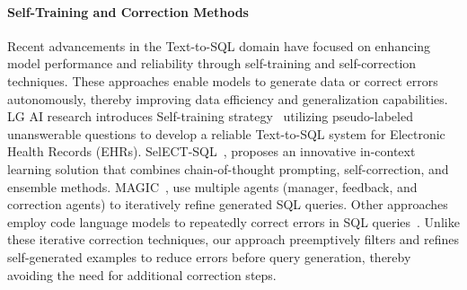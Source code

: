 \paragraph{Self-Training and Correction Methods}
Recent advancements in the Text-to-SQL domain have focused on enhancing model performance and reliability through self-training and self-correction techniques. These approaches enable models to generate data or correct errors autonomously, thereby improving data efficiency and generalization capabilities. LG AI research introduces Self-training strategy~\cite{lghealth_self} utilizing pseudo-labeled unanswerable questions to develop a reliable Text-to-SQL system for Electronic Health Records (EHRs). SelECT-SQL~\cite{self_correct}, proposes an innovative in-context learning solution that combines chain-of-thought prompting, self-correction, and ensemble methods. MAGIC~\cite{magic}, use multiple agents (manager, feedback, and correction agents) to iteratively refine generated SQL queries. Other approaches employ code language models to repeatedly correct errors in SQL queries~\cite{self_error_correct}. Unlike these iterative correction techniques, our approach preemptively filters and refines self-generated examples to reduce errors before query generation, thereby avoiding the need for additional correction steps.
